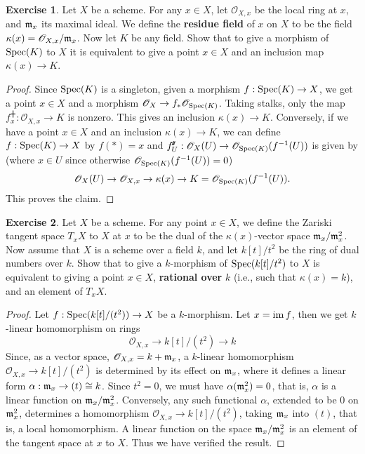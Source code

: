 \documentclass[11pt]{book}
\theoremstyle{definition}
\newtheorem{exercise}{Exercise}[section]
\begin{document}
\begin{exercise}
Let $X$ be a scheme. For any $x\in X$, let $\mathscr{O}_{X,x}$ be the local ring at $x$, and $\mathfrak{m}_x$ its maximal ideal. We define the \textbf{residue field} of $x$ on $X$ to be the field $\kappa(x)=\mathscr{O}_{X,x}/\mathfrak{m}_x$. Now let $K$ be any field. Show that to give a morphism of $\mathrm{Spec}(K)$ to $X$ it is equivalent to give a point $x\in X$ and an inclusion map $\kappa(x)\to K$.
\end{exercise}
\begin{proof}
Since $\mathrm{Spec}(K)$ is a singleton, given a morphism $f:\mathrm{Spec}(K)\to X$, we get a point $x\in X$ and a morphism $\mathscr{O}_X\to f_*\mathscr{O}_{\mathrm{Spec}(K)}$. Taking stalks, only the map $f^{\hash}_x:\mathscr{O}_{X,x}\to K$ is nonzero. This gives an inclusion $\kappa(x)\to K$. Conversely, if we have a point $x\in X$ and an inclusion $\kappa(x)\to K$, we can define $f:\mathrm{Spec}(K)\to X$ by $f(\ast)=x$ and $f^{\!\textit{\texttt{\#}}}_U:\mathscr{O}_{X}(U)\to\mathscr{O}_{\mathrm{Spec}(K)}(f^{-1}(U))$ is given by (where $x\in U$ since otherwise $\mathscr{O}_{\mathrm{Spec}(K)}(f^{-1}(U))=0$)
\[\mathscr{O}_{X}(U)\to \mathscr{O}_{X,x}\to\kappa(x)\to K=\mathscr{O}_{\mathrm{Spec}(K)}(f^{-1}(U)).\]
This proves the claim.
\end{proof}
\begin{exercise}
Let $X$ be a scheme. For any point $x\in X$, we define the Zariski tangent space $T_xX$ to $X$ at $x$ to be the dual of the $\kappa(x)$-vector space $\mathfrak{m}_x/\mathfrak{m}_x^2$. Now assume that $X$ is a scheme over a field $k$, and let $k[t]/t^2$ be the ring of dual numbers over $k$. Show that to give a $k$-morphism of $\mathrm{Spec}(k[t]/t^2)$ to $X$ is equivalent to giving a point $x\in X$, \textbf{rational over} $k$ (i.e., such that $\kappa(x)=k$), and an element of $T_xX$.
\end{exercise}
\begin{proof}
Let $f:\mathrm{Spec}(k[t]/(t^2))\to X$ be a $k$-morphism. Let $x=\mathrm{im}\, f$, then we get $k$-linear homomorphism on rings
\[\mathscr{O}_{X,x}\to k[t]/(t^2)\to k\]
Since, as a vector space, $\mathscr{O}_{X,x}=k+\mathfrak{m}_x$, a $k$-linear homomorphism $\mathscr{O}_{X,x}\to k[t]/(t^2)$ is determined by its effect on $\mathfrak{m}_x$, where it defines a linear form $\alpha:\mathfrak{m}_x\to (t)\cong k$. Since $t^2=0$, we must have $\alpha(\mathfrak{m}_x^2)=0$, that is, $\alpha$ is a linear function on $\mathfrak{m}_x/\mathfrak{m}_x^2$. Conversely, any such functional $\alpha$, extended to be $0$ on $\mathfrak{m}_x^2$, determines a homomorphism $\mathscr{O}_{X,x}\to k[t]/(t^2)$, taking $\mathfrak{m}_x$ into $(t)$, that is, a local homomorphism. A linear function on the space $\mathfrak{m}_x/\mathfrak{m}_x^2$ is an element of the tangent space at $x$ to $X$. Thus we have verified the  result.
\end{proof}
\end{document}
